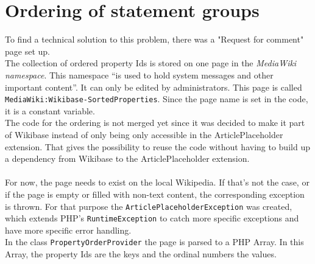 \section{Ordering of statement groups}\label{ordering-stat}

To find a technical solution to this problem, there was a "Request for comment" page set up. \citep{wiki:24} \\

The collection of ordered property Ids is stored on one page in the \textit{MediaWiki namespace}. This namespace ``is used to hold system messages and other important content''. \citep{wiki:17} It can only be edited by administrators. This page is called \texttt{\justify MediaWiki:Wikibase-SortedProperties}. Since the page name is set in the code, it is a constant variable. \\
The code for the ordering is not merged yet since it was decided to make it part of Wikibase instead of only being only accessible in the ArticlePlaceholder extension. That gives the possibility to reuse the code without having to build up a dependency from Wikibase to the ArticlePlaceholder extension. \\
\\
For now, the page needs to exist on the local Wikipedia. If that's not the case, or if the page is empty or filled with non-text content, the corresponding exception is thrown. For that purpose the \texttt{\justify ArticlePlaceholderException} was created, which extends PHP's \texttt{\justify RuntimeException} to catch more specific exceptions and have more specific error handling. \\
In the class \texttt{\justify PropertyOrderProvider} the page is parsed to a PHP Array. In this Array, the property Ids are the keys and the ordinal numbers the values. \\

